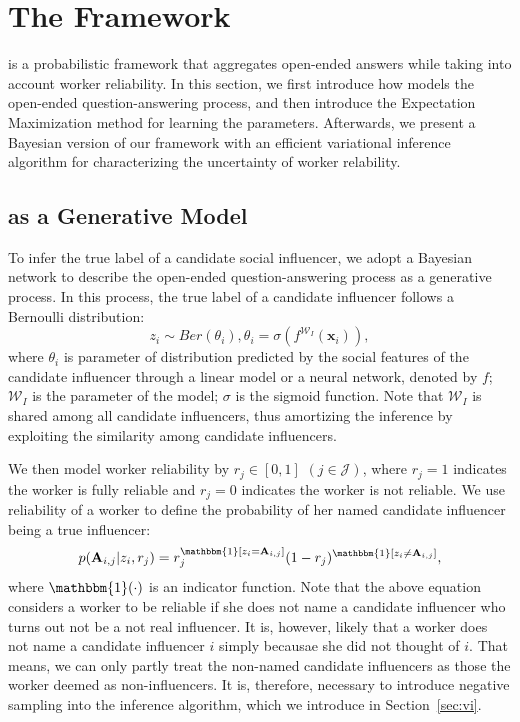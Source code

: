 \section{The \sys Framework}

\sys is a probabilistic framework that aggregates open-ended answers while taking into account worker reliability. In this section, we first introduce how \sys models the open-ended question-answering process, and then introduce the Expectation Maximization method for learning the parameters. Afterwards, we present a Bayesian version of our framework with an efficient variational inference algorithm for characterizing the uncertainty of worker relability. 

\subsection{\sys as a Generative Model}
To infer the true label of a candidate social influencer, we adopt a Bayesian network to describe the open-ended question-answering process as a generative process. In this process, the true label of a candidate influencer follows a Bernoulli distribution:
%
\begin{equation}
    z_i \sim Ber(\theta_i), \theta_i  = \sigma (f^{\mathcal{W}_I}(\mathbf{x}_i)),
    \label{eq:dis_item}
\end{equation}
%
where $\theta_i$ is parameter of distribution predicted by the social features of the candidate influencer through a linear model or a neural network, denoted by $f$; $\mathcal{W}_I$ is the parameter of the model; $\sigma$ is the sigmoid function. Note that $\mathcal{W}_I$ is shared among all candidate influencers, thus amortizing the inference \cite{gershman2014amortized} by exploiting the similarity among candidate influencers. 


We then model worker reliability by $r_j \in [0,1]$ $(j\in \mathcal{J})$, where $r_j=1$ indicates the worker is fully reliable and $r_j=0$ indicates the worker is not reliable. We use  reliability of a worker to define the probability of her named candidate influencer being a true influencer:
%
\begin{equation}
    p(\mathbf{A}_{i,j} | z_i,  r_j) = r_j^{\mathbbm{1}[z_i=\mathbf{A}_{i,j}]} (1- r_j)^{\mathbbm{1}[z_i\ne \mathbf{A}_{i,j}]},
    \label{eq:item_worker}
\end{equation}
%
where $\mathbbm{1}(\cdot)$ is an indicator function. Note that the above equation considers a worker to be reliable if she does not name a candidate influencer who turns out not be a not real influencer. It is, however, likely that a worker does not name a candidate influencer $i$ simply becausae she did not thought of $i$. That means, we can only partly treat the non-named candidate influencers as those the worker deemed as non-influencers. It is, therefore, necessary to introduce negative sampling into the inference algorithm, which we introduce in Section~\ref{sec:vi}. 

